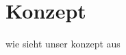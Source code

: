 \chapter{Konzept}
\begin{Spacing}{\mylinespace}

wie sieht unser konzept aus\\

\end{Spacing}
\newpage
\clearpage
